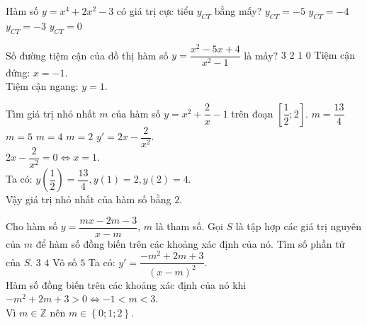 \begin{ex}%
Hàm số $y = x^4+2x^2-3$ có giá trị cực tiểu $y_{CT}$ bằng mấy?
 \choice
  { $y_{CT} = -5$}
  { $y_{CT} = -4$}
  { \True $y_{CT} = -3$}
  { $y_{CT} = 0$}
  {
  
  }
\end{ex}


\begin{ex}%
Số đường tiệm cận của đồ thị hàm số $y = \dfrac{x^2-5x+4}{x^2-1}$ là mấy?
 \choice
  { $3$}
  { \True $2$}
  { $1$}
  { $0$}
 \loigiai
  {
  Tiệm cận đứng: $x = -1$.\\
  Tiệm cận ngang: $y = 1$.
  }
\end{ex}


\begin{ex}%
Tìm giá trị nhỏ nhất $m$ của hàm số $y = x^2 + \dfrac{2}{x} -1$ trên đoạn $\left[ \dfrac{1}{2}; 2 \right]$.
 \choice
  { $m = \dfrac{13}{4}$}
  { $m = 5$}
  { $m = 4$}
  { \True $m = 2$}
 \loigiai
  {
  $y' = 2x - \dfrac{2}{x^2}$.\\
   $2x - \dfrac{2}{x^2} = 0 \Leftrightarrow x = 1$.\\
   Ta có: $y\left( \dfrac{1}{2} \right)= \dfrac{13}{4}, y(1) = 2, y(2) = 4.$\\
   Vậy giá trị nhỏ nhất của hàm số bằng $2$.
  }
\end{ex}


\begin{ex}%
Cho hàm số $y = \dfrac{mx-2m-3}{x-m}$, $m$ là tham số. Gọi $S$ là tập hợp các giá trị nguyên của $m$ để hàm số đồng biến trên các khoảng xác định của nó. Tìm số phần tử của $S$.
 \choice
  { \True $3$}
  { $4$}
  { Vô số}
  { $5$}
 \loigiai
  {
  Ta có: $y' = \dfrac{-m^2+2m+3}{(x-m)^2}$.\\
  Hàm số đồng biến trên các khoảng xác định của nó khi $-m^2+2m+3>0 \Leftrightarrow -1<m<3$.\\
  Vì $m \in \mathbb{Z}$ nên $m \in \left\{0; 1; 2 \right\}$.
  }
\end{ex}


